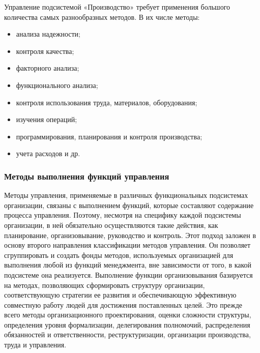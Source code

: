 \documentclass[a4paper,12pt,oneside,final]{extarticle}
\numberwithin{equation}{section}
\begin{document}
Управление подсистемой «Производство» требует применения большого количества самых разнообразных методов. В их числе методы:
\begin{itemize}
	\item анализа надежности;
	\item контроля качества;
	\item факторного анализа;
	\item функционального анализа;
	\item контроля использования труда, материалов, оборудования;
	\item изучения операций;
	\item программирования, планирования и контроля производства;
	\item учета расходов и др.
\end{itemize}

\subsubsection{Методы выполнения функций управления}
Методы управления, применяемые в различных функциональных подсистемах организации, связаны с выполнением функций, которые составляют содержание процесса управления. 
Поэтому, несмотря на специфику каждой подсистемы организации, в ней обязательно осуществляются такие действия, как планирование, организовывание, руководство и контроль. 
Этот подход заложен в основу второго направления классификации методов управления. 
Он позволяет сгруппировать и создать фонды методов, используемых организацией для выполнения любой из функций менедж­мента, вне зависимости от того, в какой подсистеме она реализу­ется.
Выполнение функции организовывания базируется на методах, позволяющих сформировать структуру организации, соответствующую стратегии ее развития и обеспечивающую эффективную совместную работу людей для достижения поставленных целей. 
Это прежде всего методы организационного проектирования, оценки сложности структуры, определения уровня формализации, делегирования полномочий, распределения обязанностей и ответ­ственности, реструктуризации, организации производства, труда и управления.
\end{document}
